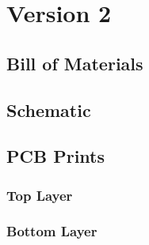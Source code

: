 \section{Version 2}\label{sec:appendix-v2}

\subsection{Bill of Materials}\label{sub:bom-v2}

\subsection{Schematic}\label{sub:schem-v2}

\subsection{PCB Prints}\label{sub:prints-v2}

\subsubsection{Top Layer}\label{sub2:top-v2}
\subsubsection{Bottom Layer}\label{sub2:bottom-v2}


